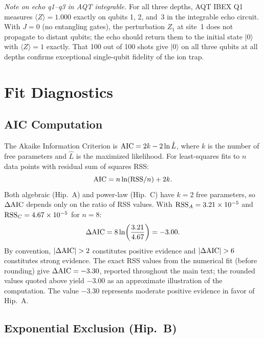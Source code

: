 \documentclass[twocolumn,showpacs,preprintnumbers,amsmath,amssymb,aps,prl]{revtex4-2}
\begin{document}
\textit{Note on echo q1--q3 in AQT integrable.}
For all three depths, AQT IBEX Q1 measures $\langle Z \rangle = 1.000$ exactly on
qubits 1, 2, and~3 in the integrable echo circuit. With $J=0$ (no entangling
gates), the perturbation $Z_1$ at site~1 does not propagate to distant qubits;
the echo should return them to the initial state $|0\rangle$ with
$\langle Z \rangle = 1$ exactly. That 100 out of 100 shots give $|0\rangle$ on
all three qubits at all depths confirms exceptional single-qubit fidelity of the
ion trap.

\section{Fit Diagnostics}

\subsection{AIC Computation}

The Akaike Information Criterion is ${\rm AIC} = 2k - 2\ln\hat{L}$, where $k$ is
the number of free parameters and $\hat{L}$ is the maximized likelihood. For
least-squares fits to $n$ data points with residual sum of squares RSS:
\begin{equation}
  {\rm AIC} = n\ln({\rm RSS}/n) + 2k.
\end{equation}
Both algebraic (Hip.~A) and power-law (Hip.~C) have $k=2$ free parameters, so
$\Delta{\rm AIC}$ depends only on the ratio of RSS values. With
${\rm RSS}_A = 3.21\times10^{-5}$ and ${\rm RSS}_C = 4.67\times10^{-5}$ for
$n=8$:
\begin{equation}
  \Delta{\rm AIC} = 8\ln\!\left(\frac{3.21}{4.67}\right) = -3.00.
\end{equation}
By convention, $|\Delta{\rm AIC}| > 2$ constitutes positive evidence and
$|\Delta{\rm AIC}| > 6$ constitutes strong evidence. The exact RSS values from
the numerical fit (before rounding) give $\Delta{\rm AIC} = -3.30$, reported
throughout the main text; the rounded values quoted above yield $-3.00$ as an
approximate illustration of the computation. The value $-3.30$ represents
moderate positive evidence in favor of Hip.~A.

\subsection{Exponential Exclusion (Hip.~B)}
\end{document}

